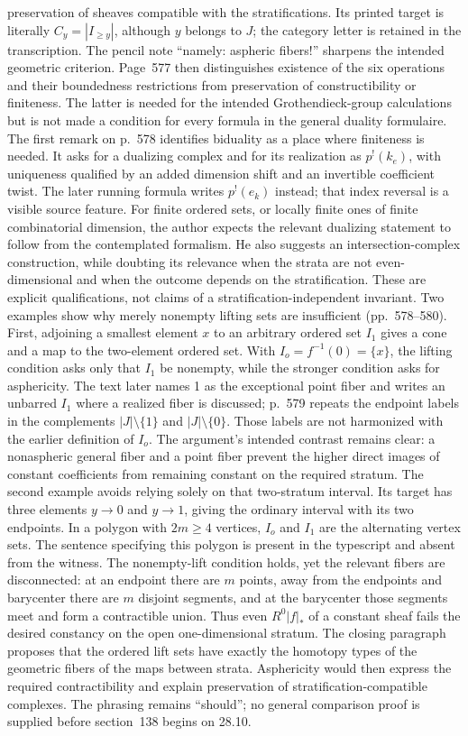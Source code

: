 \documentclass[10pt,oneside]{book}
\begin{document}
preservation of sheaves compatible with the stratifications. Its printed target is literally $C_y=|I_{\geq y}|$, although $y$ belongs to $J$; the category letter is retained in the transcription. The pencil note ``namely: aspheric fibers!'' sharpens the intended geometric criterion. Page~577 then distinguishes existence of the six operations and their boundedness restrictions from preservation of constructibility or finiteness. The latter is needed for the intended Grothendieck-group calculations but is not made a condition for every formula in the general duality formulaire. The first remark on p.~578 identifies biduality as a place where finiteness is needed. It asks for a dualizing complex and for its realization as $p^!(k_e)$, with uniqueness qualified by an added dimension shift and an invertible coefficient twist. The later running formula writes $p^!(e_k)$ instead; that index reversal is a visible source feature. For finite ordered sets, or locally finite ones of finite combinatorial dimension, the author expects the relevant dualizing statement to follow from the contemplated formalism. He also suggests an intersection-complex construction, while doubting its relevance when the strata are not even-dimensional and when the outcome depends on the stratification. These are explicit qualifications, not claims of a stratification-independent invariant. Two examples show why merely nonempty lifting sets are insufficient (pp.~578--580). First, adjoining a smallest element $x$ to an arbitrary ordered set $I_1$ gives a cone and a map to the two-element ordered set. With $I_o=f^{-1}(0)=\{x\}$, the lifting condition asks only that $I_1$ be nonempty, while the stronger condition asks for asphericity. The text later names 1 as the exceptional point fiber and writes an unbarred $I_1$ where a realized fiber is discussed; p.~579 repeats the endpoint labels in the complements $|J|\setminus\{1\}$ and $|J|\setminus\{0\}$. Those labels are not harmonized with the earlier definition of $I_o$. The argument's intended contrast remains clear: a nonaspheric general fiber and a point fiber prevent the higher direct images of constant coefficients from remaining constant on the required stratum. The second example avoids relying solely on that two-stratum interval. Its target has three elements $y\to0$ and $y\to1$, giving the ordinary interval with its two endpoints. In a polygon with $2m\geq4$ vertices, $I_o$ and $I_1$ are the alternating vertex sets. The sentence specifying this polygon is present in the typescript and absent from the witness. The nonempty-lift condition holds, yet the relevant fibers are disconnected: at an endpoint there are $m$ points, away from the endpoints and barycenter there are $m$ disjoint segments, and at the barycenter those segments meet and form a contractible union. Thus even $R^0|f|_*$ of a constant sheaf fails the desired constancy on the open one-dimensional stratum. The closing paragraph proposes that the ordered lift sets have exactly the homotopy types of the geometric fibers of the maps between strata. Asphericity would then express the required contractibility and explain preservation of stratification-compatible complexes. The phrasing remains ``should''; no general comparison proof is supplied before section~138 begins on 28.10.
\end{document}
